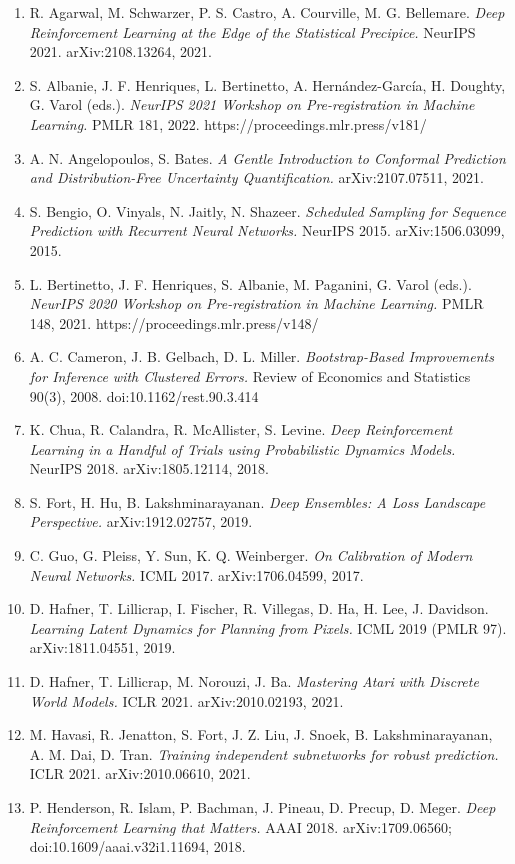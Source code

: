 \documentclass[10pt]{article}
\begin{document}
\begin{enumerate}
\item R. Agarwal, M. Schwarzer, P. S. Castro, A. Courville, M. G. Bellemare. \emph{Deep Reinforcement Learning at the Edge of the Statistical Precipice.} NeurIPS 2021. arXiv:2108.13264, 2021.
\item S. Albanie, J. F. Henriques, L. Bertinetto, A. Hernández-García, H. Doughty, G. Varol (eds.). \emph{NeurIPS 2021 Workshop on Pre-registration in Machine Learning.} PMLR 181, 2022. https://proceedings.mlr.press/v181/
\item A. N. Angelopoulos, S. Bates. \emph{A Gentle Introduction to Conformal Prediction and Distribution-Free Uncertainty Quantification.} arXiv:2107.07511, 2021.
\item S. Bengio, O. Vinyals, N. Jaitly, N. Shazeer. \emph{Scheduled Sampling for Sequence Prediction with Recurrent Neural Networks.} NeurIPS 2015. arXiv:1506.03099, 2015.
\item L. Bertinetto, J. F. Henriques, S. Albanie, M. Paganini, G. Varol (eds.). \emph{NeurIPS 2020 Workshop on Pre-registration in Machine Learning.} PMLR 148, 2021. https://proceedings.mlr.press/v148/
\item A. C. Cameron, J. B. Gelbach, D. L. Miller. \emph{Bootstrap-Based Improvements for Inference with Clustered Errors.} Review of Economics and Statistics 90(3), 2008. doi:10.1162/rest.90.3.414
\item K. Chua, R. Calandra, R. McAllister, S. Levine. \emph{Deep Reinforcement Learning in a Handful of Trials using Probabilistic Dynamics Models.} NeurIPS 2018. arXiv:1805.12114, 2018.
\item S. Fort, H. Hu, B. Lakshminarayanan. \emph{Deep Ensembles: A Loss Landscape Perspective.} arXiv:1912.02757, 2019.
\item C. Guo, G. Pleiss, Y. Sun, K. Q. Weinberger. \emph{On Calibration of Modern Neural Networks.} ICML 2017. arXiv:1706.04599, 2017.
\item D. Hafner, T. Lillicrap, I. Fischer, R. Villegas, D. Ha, H. Lee, J. Davidson. \emph{Learning Latent Dynamics for Planning from Pixels.} ICML 2019 (PMLR 97). arXiv:1811.04551, 2019.
\item D. Hafner, T. Lillicrap, M. Norouzi, J. Ba. \emph{Mastering Atari with Discrete World Models.} ICLR 2021. arXiv:2010.02193, 2021.
\item M. Havasi, R. Jenatton, S. Fort, J. Z. Liu, J. Snoek, B. Lakshminarayanan, A. M. Dai, D. Tran. \emph{Training independent subnetworks for robust prediction.} ICLR 2021. arXiv:2010.06610, 2021.
\item P. Henderson, R. Islam, P. Bachman, J. Pineau, D. Precup, D. Meger. \emph{Deep Reinforcement Learning that Matters.} AAAI 2018. arXiv:1709.06560; doi:10.1609/aaai.v32i1.11694, 2018.

\end{enumerate}
\end{document}
